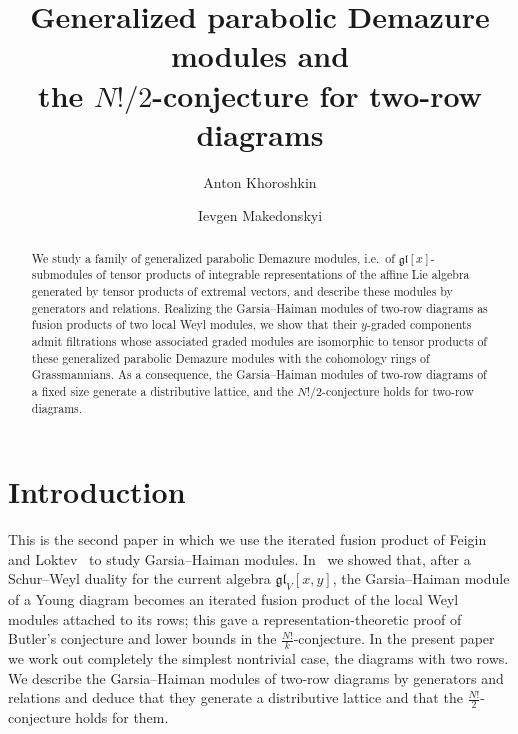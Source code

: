 \documentclass[11pt]{amsart}
\numberwithin{equation}{section}
\theoremstyle{definition}
\newcommand{\gl}{\mathfrak{gl}}
\begin{document}
	
	\title[Two-row Garsia--Haiman modules]{Generalized parabolic Demazure modules and \\ the $N!/2$-conjecture for two-row diagrams}
	
	\author{Anton Khoroshkin}
	\address{Anton Khoroshkin: Department of Mathematics, University of Haifa, Mount Carmel, 3498838, Haifa, Israel}
	
	\author{Ievgen Makedonskyi}
	\address{Ievgen Makedonskyi: Yanqi Lake Beijing Institute of Mathematical Sciences And Applications (BIMSA), No.~544, Hefangkou Village, Huaibei Town, Huairou District, Beijing 101408}
	
	
	\begin{abstract}
		We study a family of generalized parabolic Demazure modules, i.e.\ of $\gl[x]$-submodules of tensor products of integrable representations of the affine Lie algebra generated by tensor products of extremal vectors, and describe these modules by generators and relations. Realizing the Garsia--Haiman modules of two-row diagrams as fusion products of two local Weyl modules, we show that their $y$-graded components admit filtrations whose associated graded modules are isomorphic to tensor products of these generalized parabolic Demazure modules with the cohomology rings of Grassmannians. As a consequence, the Garsia--Haiman modules of two-row diagrams of a fixed size generate a distributive lattice, and the $N!/2$-conjecture holds for two-row diagrams.
	\end{abstract}
	
	
	\maketitle
	
	\setcounter{tocdepth}{1}
	\tableofcontents
	
	\section{Introduction}\label{sec:intro}
	
	This is the second paper in which we use the iterated fusion product of Feigin and Loktev~\cite{FeLo} to study Garsia--Haiman modules. In~\cite{KM} we showed that, after a Schur--Weyl duality for the current algebra $\gl_V[x,y]$, the Garsia--Haiman module of a Young diagram becomes an iterated fusion product of the local Weyl modules attached to its rows; this gave a representation-theoretic proof of Butler's conjecture and lower bounds in the $\frac{N!}{k}$-conjecture. In the present paper we work out completely the simplest nontrivial case, the diagrams with two rows. We describe the Garsia--Haiman modules of two-row diagrams by generators and relations and deduce that they generate a distributive lattice and that the $\frac{N!}{2}$-conjecture holds for them.
	
\end{document}
